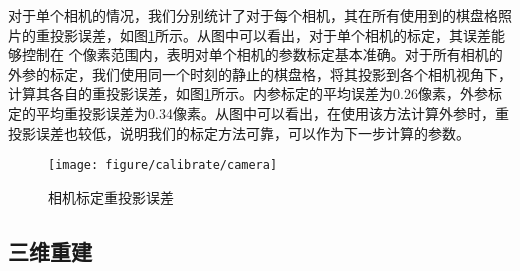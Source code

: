 对于单个相机的情况，我们分别统计了对于每个相机，其在所有使用到的棋盘格照片的重投影误差，如图\ref{fig:cal-all}所示。从图中可以看出，对于单个相机的标定，其误差能够控制在 个像素范围内，表明对单个相机的参数标定基本准确。对于所有相机的外参的标定，我们使用同一个时刻的静止的棋盘格，将其投影到各个相机视角下，计算其各自的重投影误差，如图\ref{fig:cal-all}所示。内参标定的平均误差为0.26像素，外参标定的平均重投影误差为0.34像素。从图中可以看出，在使用该方法计算外参时，重投影误差也较低，说明我们的标定方法可靠，可以作为下一步计算的参数。
\begin{figure}[htbp]
    \centering
    \texttt{[image: figure/calibrate/camera]}
    \caption{\label{fig:cal-all} 相机标定重投影误差}
\end{figure}  
\subsection{三维重建}

